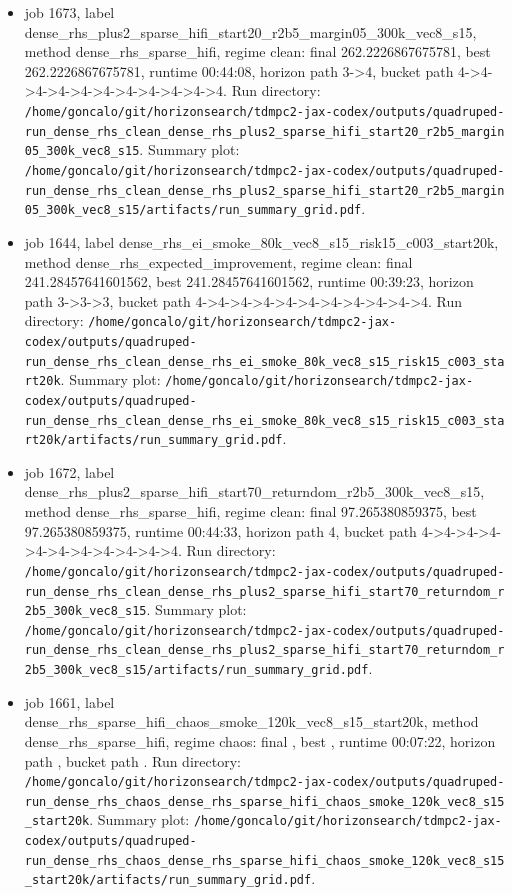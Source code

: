 \begin{itemize}
\item job 1673, label dense\_rhs\_plus2\_sparse\_hifi\_start20\_r2b5\_margin05\_300k\_vec8\_s15, method dense\_rhs\_sparse\_hifi, regime clean: final 262.2226867675781, best 262.2226867675781, runtime 00:44:08, horizon path 3->4, bucket path 4->4->4->4->4->4->4->4->4->4->4. Run directory: \texttt{/home/goncalo/git/horizonsearch/tdmpc2-jax-codex/outputs/quadruped-run\_dense\_rhs\_clean\_dense\_rhs\_plus2\_sparse\_hifi\_start20\_r2b5\_margin05\_300k\_vec8\_s15}. Summary plot: \texttt{/home/goncalo/git/horizonsearch/tdmpc2-jax-codex/outputs/quadruped-run\_dense\_rhs\_clean\_dense\_rhs\_plus2\_sparse\_hifi\_start20\_r2b5\_margin05\_300k\_vec8\_s15/artifacts/run\_summary\_grid.pdf}.
\item job 1644, label dense\_rhs\_ei\_smoke\_80k\_vec8\_s15\_risk15\_c003\_start20k, method dense\_rhs\_expected\_improvement, regime clean: final 241.28457641601562, best 241.28457641601562, runtime 00:39:23, horizon path 3->3->3, bucket path 4->4->4->4->4->4->4->4->4->4->4. Run directory: \texttt{/home/goncalo/git/horizonsearch/tdmpc2-jax-codex/outputs/quadruped-run\_dense\_rhs\_clean\_dense\_rhs\_ei\_smoke\_80k\_vec8\_s15\_risk15\_c003\_start20k}. Summary plot: \texttt{/home/goncalo/git/horizonsearch/tdmpc2-jax-codex/outputs/quadruped-run\_dense\_rhs\_clean\_dense\_rhs\_ei\_smoke\_80k\_vec8\_s15\_risk15\_c003\_start20k/artifacts/run\_summary\_grid.pdf}.
\item job 1672, label dense\_rhs\_plus2\_sparse\_hifi\_start70\_returndom\_r2b5\_300k\_vec8\_s15, method dense\_rhs\_sparse\_hifi, regime clean: final 97.265380859375, best 97.265380859375, runtime 00:44:33, horizon path 4, bucket path 4->4->4->4->4->4->4->4->4->4->4. Run directory: \texttt{/home/goncalo/git/horizonsearch/tdmpc2-jax-codex/outputs/quadruped-run\_dense\_rhs\_clean\_dense\_rhs\_plus2\_sparse\_hifi\_start70\_returndom\_r2b5\_300k\_vec8\_s15}. Summary plot: \texttt{/home/goncalo/git/horizonsearch/tdmpc2-jax-codex/outputs/quadruped-run\_dense\_rhs\_clean\_dense\_rhs\_plus2\_sparse\_hifi\_start70\_returndom\_r2b5\_300k\_vec8\_s15/artifacts/run\_summary\_grid.pdf}.
\item job 1661, label dense\_rhs\_sparse\_hifi\_chaos\_smoke\_120k\_vec8\_s15\_start20k, method dense\_rhs\_sparse\_hifi, regime chaos: final , best , runtime 00:07:22, horizon path , bucket path . Run directory: \texttt{/home/goncalo/git/horizonsearch/tdmpc2-jax-codex/outputs/quadruped-run\_dense\_rhs\_chaos\_dense\_rhs\_sparse\_hifi\_chaos\_smoke\_120k\_vec8\_s15\_start20k}. Summary plot: \texttt{/home/goncalo/git/horizonsearch/tdmpc2-jax-codex/outputs/quadruped-run\_dense\_rhs\_chaos\_dense\_rhs\_sparse\_hifi\_chaos\_smoke\_120k\_vec8\_s15\_start20k/artifacts/run\_summary\_grid.pdf}.
\end{itemize}

